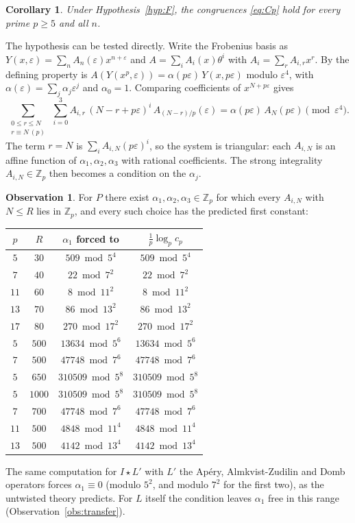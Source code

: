 \documentclass[11pt]{amsart}
\newtheorem{corollary}[theorem]{Corollary}
\theoremstyle{definition}
\newtheorem{observation}[theorem]{Observation}
\theoremstyle{remark}
\newcommand{\Z}{\mathbb{Z}}
\begin{document}
\begin{corollary}
Under Hypothesis~\ref{hyp:F}, the congruences \eqref{eq:Cp} hold for every prime $p\ge5$ and all $n$.
\end{corollary}

The hypothesis can be tested directly. Write the Frobenius basis as
$Y(x,\varepsilon)=\sum_nA_n(\varepsilon)x^{n+\varepsilon}$ and $A=\sum_iA_i(x)\theta^i$ with
$A_i=\sum_rA_{i,r}x^r$. By \cite[Remark~1.2]{BV} the defining property is
$A(Y(x^p,\varepsilon))=\alpha(p\varepsilon)\,Y(x,p\varepsilon)$ modulo $\varepsilon^4$, with
$\alpha(\varepsilon)=\sum_j\alpha_j\varepsilon^j$ and $\alpha_0=1$. Comparing coefficients of
$x^{N+p\varepsilon}$ gives
\[
\sum_{\substack{0\le r\le N\\ r\equiv N\ (p)}}\ \sum_{i=0}^3 A_{i,r}\,(N-r+p\varepsilon)^i\,
A_{(N-r)/p}(\varepsilon)=\alpha(p\varepsilon)\,A_N(p\varepsilon)\pmod{\varepsilon^4}.
\]
The term $r=N$ is $\sum_iA_{i,N}(p\varepsilon)^i$, so the system is triangular: each $A_{i,N}$ is an
affine function of $\alpha_1,\alpha_2,\alpha_3$ with rational coefficients. The strong integrality
$A_{i,N}\in\Z_p$ then becomes a condition on the $\alpha_j$.

\begin{observation}\label{obs:frob}
For $P$ there exist $\alpha_1,\alpha_2,\alpha_3\in\Z_p$ for which every $A_{i,N}$ with $N\le R$
lies in $\Z_p$, and every such choice has the predicted first constant:
\begin{center}
\begin{tabular}{cccc}
\toprule
$p$ & $R$ & $\alpha_1$ forced to & $\frac1p\log_pc_p$\\
\midrule
$5$ & $30$ & $509 \bmod 5^4$ & $509 \bmod 5^4$\\
$7$ & $40$ & $22 \bmod 7^2$ & $22 \bmod 7^2$\\
$11$ & $60$ & $8 \bmod 11^2$ & $8 \bmod 11^2$\\
$13$ & $70$ & $86 \bmod 13^2$ & $86 \bmod 13^2$\\
$17$ & $80$ & $270 \bmod 17^2$ & $270 \bmod 17^2$\\
$5$ & $500$ & $13634 \bmod 5^6$ & $13634 \bmod 5^6$\\
$7$ & $500$ & $47748 \bmod 7^6$ & $47748 \bmod 7^6$\\
$5$ & $650$ & $310509 \bmod 5^8$ & $310509 \bmod 5^8$\\
$5$ & $1000$ & $310509 \bmod 5^8$ & $310509 \bmod 5^8$\\
$7$ & $700$ & $47748 \bmod 7^6$ & $47748 \bmod 7^6$\\
$11$ & $500$ & $4848 \bmod 11^4$ & $4848 \bmod 11^4$\\
$13$ & $500$ & $4142 \bmod 13^4$ & $4142 \bmod 13^4$\\
\bottomrule
\end{tabular}
\end{center}
The same computation for $I\star L'$ with $L'$ the Ap\'ery, Almkvist-Zudilin and Domb operators
forces $\alpha_1\equiv0$ (modulo $5^2$, and modulo $7^2$ for the first two), as the untwisted theory
predicts. For $L$ itself the condition leaves $\alpha_1$ free in this range
(Observation~\ref{obs:transfer}).
\end{observation}
\end{document}
